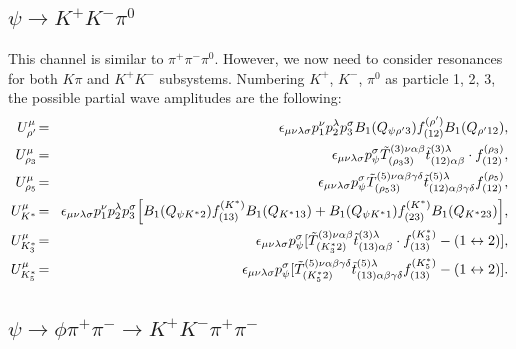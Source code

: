 \subsection{$\psi\to K^+K^-\pi^0$}
This channel is similar to $\pi^+\pi^-\pi^0$. However, we now need
to consider resonances for both $K\pi$ and $K^+K^-$ subsystems.
Numbering $K^+$, $K^-$, $\pi^0$ as particle 1, 2, 3, the possible
partial wave amplitudes are the following:
\begin{eqnarray}
U_{\rho'}^\mu \!&=&\! \epsilon_{\mu\nu\lambda\sigma} p_1^\nu
p_2^\lambda p_3^\sigma B_1(
Q_{\psi\rho' 3}) f^{(\rho')}_{(12)}B_1(Q_{\rho' 12}), \\
U_{\rho_3}^\mu \!&=&\! \epsilon_{\mu\nu\lambda\sigma}p_\psi^\sigma
\tilde T^{(3)\nu\alpha\beta}_{(\rho_3 3)}\tilde
t^{(3)\lambda}_{(12)\alpha\beta}\cdot f^{(\rho_3)}_{(12)},\\
U_{\rho_5}^\mu \!&=&\! \epsilon_{\mu\nu\lambda\sigma}
p_\psi^\sigma \tilde T^{(5)\nu\alpha\beta\gamma\delta}_{(\rho_53)}
\tilde t^{(5)\lambda}_{(12)\alpha\beta\gamma\delta}
f^{(\rho_5)}_{(12)},\\
U_{K^*}^\mu \!&=&\! \epsilon_{\mu\nu\lambda\sigma} p_1^\nu
p_2^\lambda p_3^\sigma \Bigl[B_1(Q_{\psi K^* 2}) f^{(K^*)}_{(13)}
B_1(Q_{K^* 13}) +
B_1(Q_{\psi K^* 1}) f^{(K^*)}_{(23)} B_1(Q_{K^* 23})\Bigr], \\
U_{K^*_3}^\mu \!&=&\! \epsilon_{\mu\nu\lambda\sigma} p_\psi^\sigma
[\tilde T^{(3)\nu\alpha\beta}_{(K^*_3 2)}\tilde
t^{(3)\lambda}_{(13)\alpha\beta}\cdot f^{(K^*_3)}_{(13)} -
(1\leftrightarrow 2)], \\
U_{K^*_5}^\mu \!&=&\! \epsilon_{\mu\nu\lambda\sigma} p_\psi^\sigma
[\tilde T^{(5)\nu\alpha\beta\gamma\delta}_{(K^*_52)} \tilde
t^{(5)\lambda}_{(13)\alpha\beta\gamma\delta}f^{(K^*_5)}_{(13)} -
(1\leftrightarrow 2)].
\end{eqnarray}

\subsection{$\psi\to\phi\pi^+\pi^-\to K^+K^-\pi^+\pi^-$}

